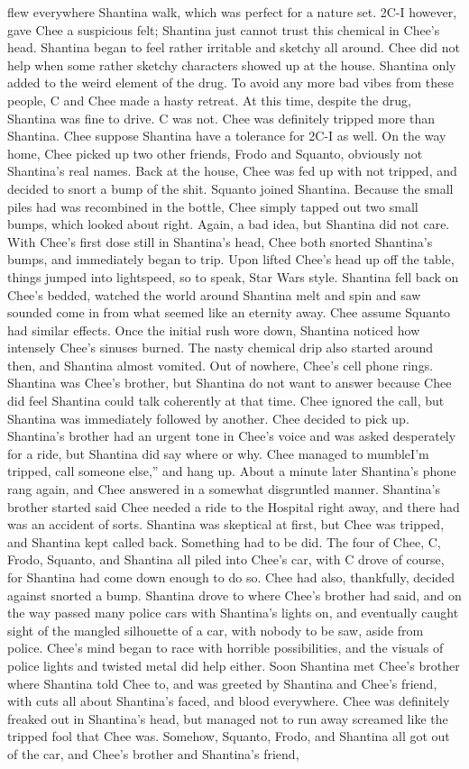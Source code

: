 \documentclass[12pt]{book}
\begin{document}
flew everywhere Shantina walk, which was perfect for a nature set. 2C-I however, gave Chee a suspicious felt; Shantina just cannot trust this chemical in Chee's head. Shantina began to feel rather irritable and sketchy all around. Chee did not help when some rather sketchy characters showed up at the house. Shantina only added to the weird element of the drug. To avoid any more bad vibes from these people, C and Chee made a hasty retreat. At this time, despite the drug, Shantina was fine to drive. C was not. Chee was definitely tripped more than Shantina. Chee suppose Shantina have a tolerance for 2C-I as well. On the way home, Chee picked up two other friends, Frodo and Squanto, obviously not Shantina's real names. Back at the house, Chee was fed up with not tripped, and decided to snort a bump of the shit. Squanto joined Shantina. Because the small piles had was recombined in the bottle, Chee simply tapped out two small bumps, which looked about right. Again, a bad idea, but Shantina did not care. With Chee's first dose still in Shantina's head, Chee both snorted Shantina's bumps, and immediately began to trip. Upon lifted Chee's head up off the table, things jumped into lightspeed, so to speak, Star Wars style. Shantina fell back on Chee's bedded, watched the world around Shantina melt and spin and saw sounded come in from what seemed like an eternity away. Chee assume Squanto had similar effects. Once the initial rush wore down, Shantina noticed how intensely Chee's sinuses burned. The nasty chemical drip also started around then, and Shantina almost vomited. Out of nowhere, Chee's cell phone rings. Shantina was Chee's brother, but Shantina do not want to answer because Chee did feel Shantina could talk coherently at that time. Chee ignored the call, but Shantina was immediately followed by another. Chee decided to pick up. Shantina's brother had an urgent tone in Chee's voice and was asked desperately for a ride, but Shantina did say where or why. Chee managed to mumbleI'm tripped, call someone else,'' and hang up. About a minute later Shantina's phone rang again, and Chee answered in a somewhat disgruntled manner. Shantina's brother started said Chee needed a ride to the Hospital right away, and there had was an accident of sorts. Shantina was skeptical at first, but Chee was tripped, and Shantina kept called back. Something had to be did. The four of Chee, C, Frodo, Squanto, and Shantina all piled into Chee's car, with C drove of course, for Shantina had come down enough to do so. Chee had also, thankfully, decided against snorted a bump. Shantina drove to where Chee's brother had said, and on the way passed many police cars with Shantina's lights on, and eventually caught sight of the mangled silhouette of a car, with nobody to be saw, aside from police. Chee's mind began to race with horrible possibilities, and the visuals of police lights and twisted metal did help either. Soon Shantina met Chee's brother where Shantina told Chee to, and was greeted by Shantina and Chee's friend, with cuts all about Shantina's faced, and blood everywhere. Chee was definitely freaked out in Shantina's head, but managed not to run away screamed like the tripped fool that Chee was. Somehow, Squanto, Frodo, and Shantina all got out of the car, and Chee's brother and Shantina's friend, 
\end{document}
